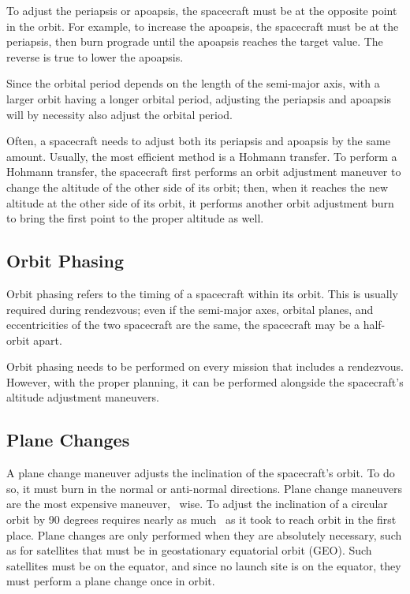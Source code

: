To adjust the periapsis or apoapsis, the spacecraft must be at the
opposite point in the orbit. For example, to increase the apoapsis,
the spacecraft must be at the periapsis, then burn prograde until the
apoapsis reaches the target value. The reverse is true to lower the
apoapsis.


Since the orbital period depends on the length of the semi-major axis,
with a larger orbit having a longer orbital period, adjusting the
periapsis and apoapsis will by necessity also adjust the orbital
period.

Often, a spacecraft needs to adjust both its periapsis and apoapsis by
the same amount. Usually, the most efficient method is a Hohmann
transfer. To perform a Hohmann transfer, the spacecraft first performs
an orbit adjustment maneuver to change the altitude of the other side
of its orbit; then, when it reaches the new altitude at the other side
of its orbit, it performs another orbit adjustment burn to bring the
first point to the proper altitude as well.

\subsection{Orbit Phasing}

Orbit phasing refers to the timing of a spacecraft within its
orbit. This is usually required during rendezvous; even if the
semi-major axes, orbital planes, and eccentricities of the two
spacecraft are the same, the spacecraft may be a half-orbit
apart.

Orbit phasing needs to be performed on every mission that includes a
rendezvous. However, with the proper planning, it can be performed
alongside the spacecraft's altitude adjustment maneuvers.

\subsection{Plane Changes}

A plane change maneuver adjusts the inclination of the spacecraft's
orbit. To do so, it must burn in the normal or anti-normal
directions. Plane change maneuvers are the most expensive maneuver, \dv\ 
wise. To adjust the inclination of a circular orbit by 90 degrees
requires nearly as much \dv\ as it took to reach orbit in the first
place. Plane changes are only performed when they are absolutely
necessary, such as for satellites that must be in geostationary
equatorial orbit (GEO). Such satellites must be on the equator, and
since no launch site is on the equator, they must perform a plane
change once in orbit.

